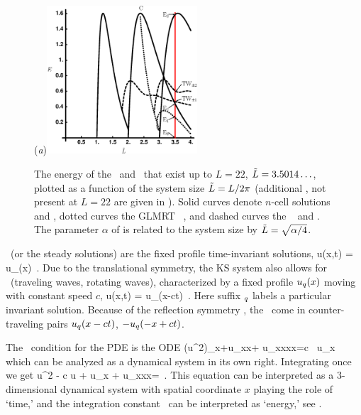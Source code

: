 \begin{figure}[ht]
\begin{center}
  (\textit{a})\includegraphics[width=0.5\textwidth]{../figs/ksBifDiag}
\end{center}
\caption[KS steady state bifurcations]{
The energy  of the \eqva\ and \reqva\ that
exist up to $L=22$, $\tilde{L} = 3.5014\ldots$, plotted as a function
of the system size $\tilde{L} = L/2\pi$ (additional \eqva, not present
at $L = 22$ are given in ). Solid curves denote
$n$-cell solutions  and , dotted curves the GLMRT
\eqv\ ,
and dashed curves the \reqva\  and .
The parameter $\alpha$ of  is
related to the system size by $\tilde{L}=\sqrt{\alpha/4}$.    }
\label{fig:ksBifDiag}
\end{figure}

\Eqva\  (or the steady solutions)
are the fixed profile time-invariant solutions,
\beq
 u(x,t) = u_\stagn(x)
\,.
Due to the translational symmetry,
the KS system also allows for
\reqva\ (traveling waves, rotating waves),
characterized by a fixed profile $u_\stagn(x)$
moving with constant speed $c$, {\ie}
\beq
 u(x,t) =  u_\stagn(x-ct)
\,.
Here suffix ${}_\stagn$ labels a particular invariant solution.
Because of the reflection symmetry ,
the \reqva\ come in counter-traveling pairs
$u_\stagn(x-ct)$, $-u_\stagn(-x+ct)$.

The \reqv\ condition for the {\KS} PDE 
is the ODE
\beq
{\textstyle{}}(u^2)_x+u_{xx}+ u_{xxxx}=c \, u_x
which can be analyzed as a dynamical system in its own right.
Integrating once we get
\beq
{\textstyle{}}u^2 - c u + u_x + u_{xxx}=\expctE
\,.
\label{eq:stdks}
\eeq
This equation can be interpreted as a 3-dimen\-si\-on\-al dynamical system
with spatial coordinate $x$ playing the role of `time,'
and the integration constant \expctE\ can be interpreted as `energy,'
see .

